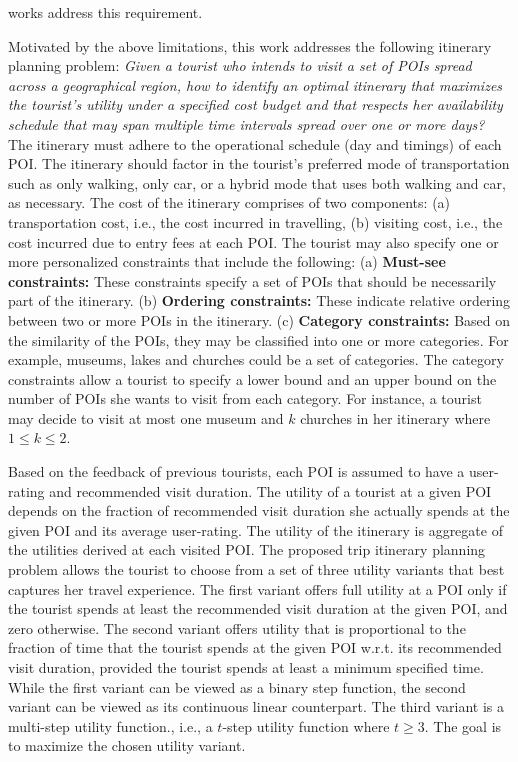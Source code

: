 works address this requirement.

Motivated by the above limitations, this work addresses the following itinerary planning problem: \emph{Given a tourist who intends to visit a set of POIs spread across a geographical region, how to  identify an optimal itinerary that maximizes the tourist's utility under a specified cost budget and that respects her availability schedule that may span multiple time intervals spread over one or more days?} The itinerary must adhere to the operational schedule (day and timings) of each POI. The itinerary should factor in the tourist's preferred mode of transportation such as only walking, only car, or a hybrid mode that uses both walking and car, as necessary. The cost of the itinerary comprises of two components: (a) transportation cost, i.e., the cost incurred in travelling, (b) visiting cost, i.e., the cost incurred due to entry fees at each POI. The tourist may also specify one or more personalized constraints that include the following: (a) \textbf{Must-see constraints:} These constraints specify a set of POIs that should be necessarily part of the itinerary. (b) \textbf{Ordering constraints:} These indicate relative ordering between two or more POIs in the itinerary. (c) \textbf{Category constraints:} Based on the similarity of the POIs, they may be classified into one or more categories. For example, museums, lakes and churches could be a set of categories.  The category constraints allow a tourist to specify a lower bound and an upper bound on the number of POIs she wants to visit from each category. For instance, a tourist may decide to visit at most one museum and $k$ churches in her itinerary where $1 \le k \le 2$. 

Based on the feedback of previous tourists, each POI is assumed to have a user-rating and recommended visit duration. The utility of a tourist at a given POI depends on the fraction of recommended visit duration she actually spends at the given POI and its average user-rating. The utility of the itinerary is aggregate of the utilities derived at each visited POI. The proposed trip itinerary planning problem allows the tourist to choose from a set of three utility variants that best captures her travel experience. The first variant offers full utility at a POI only if the tourist spends at least the recommended visit duration at the given POI, and zero otherwise. The second variant offers utility that is proportional to the fraction of time that the tourist spends at the given POI w.r.t. its recommended visit duration, provided the tourist  spends at least a minimum specified time. While the first variant can be viewed as a binary step function, the second variant can be viewed as its continuous linear counterpart. The third variant is a multi-step utility function., i.e., a $t$-step utility function where $t \ge 3$. The goal is to maximize the chosen utility variant.

